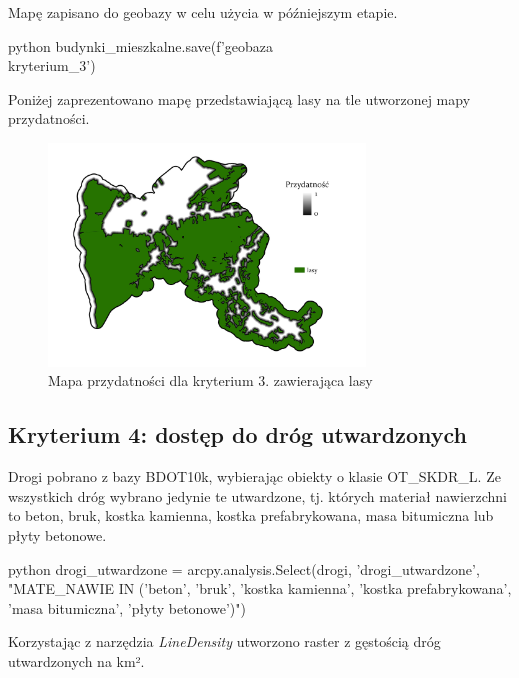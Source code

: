 \documentclass{article}
\begin{document}
Mapę zapisano do geobazy w celu użycia w późniejszym etapie.
\vspace{5pt}

\begin{mintedbox}{python}
budynki_mieszkalne.save(f'{geobaza}\\kryterium_3')
\end{mintedbox}
\vspace{10pt}

Poniżej zaprezentowano mapę przedstawiającą lasy na tle utworzonej mapy przydatności.

\begin{figure}[H]
    \centering
    \includegraphics[width=0.75\textwidth]{img/kryterium3-lasy.jpg}
    \caption{Mapa przydatności dla kryterium 3. zawierająca lasy}
\end{figure}
\vspace{10pt}


\subsection{Kryterium 4: dostęp do dróg utwardzonych}
Drogi pobrano z bazy BDOT10k, wybierając obiekty o klasie OT\_SKDR\_L. Ze wszystkich dróg wybrano jedynie te utwardzone, tj. których materiał nawierzchni to beton, bruk, kostka kamienna, kostka prefabrykowana, masa bitumiczna lub płyty betonowe.
\vspace{5pt}

\begin{mintedbox}{python}
drogi_utwardzone = arcpy.analysis.Select(drogi, 'drogi_utwardzone', "MATE_NAWIE IN ('beton', 'bruk', 'kostka kamienna', 'kostka prefabrykowana', 'masa bitumiczna', 'płyty betonowe')")
\end{mintedbox}
\vspace{10pt}

Korzystając z narzędzia \textit{LineDensity} utworzono raster z gęstością dróg utwardzonych na km².
\vspace{5pt}
\end{document}

